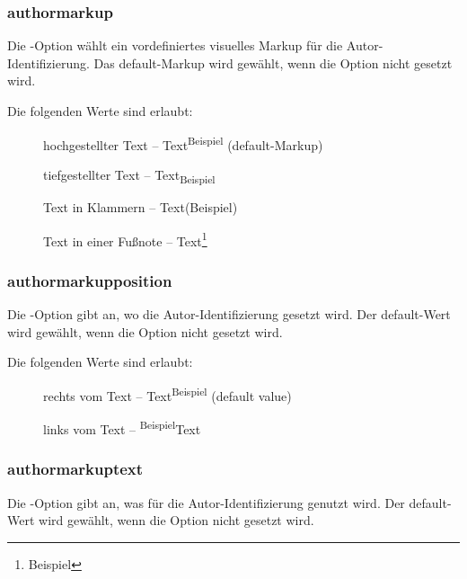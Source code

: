 



\subsubsection{authormarkup}

Die -Option wählt ein vordefiniertes visuelles Markup für die Autor-Identifizierung.
Das default-Markup wird gewählt, wenn die Option nicht gesetzt wird.

Die folgenden Werte sind erlaubt:
\begin{description}
	\item [] hochgestellter Text -- Text\textsuperscript{Beispiel} (default-Markup)
	\item [] tiefgestellter Text -- Text\textsubscript{Beispiel}
	\item [] Text in Klammern -- Text(Beispiel)
	\item [] Text in einer Fußnote -- Text\footnote{Beispiel}
\end{description}




\subsubsection{authormarkupposition}

Die -Option gibt an, wo die Autor-Identifizierung gesetzt wird.
Der default-Wert wird gewählt, wenn die Option nicht gesetzt wird.

Die folgenden Werte sind erlaubt:
\begin{description}
	\item [] rechts vom Text -- Text\textsuperscript{Beispiel} (default value)
	\item [] links vom Text -- \textsuperscript{Beispiel}Text
\end{description}




\subsubsection{authormarkuptext}

Die -Option gibt an, was für die Autor-Identifizierung genutzt wird.
Der default-Wert wird gewählt, wenn die Option nicht gesetzt wird.

